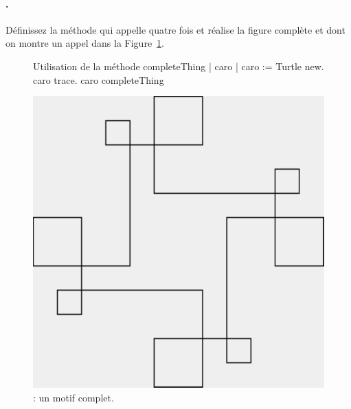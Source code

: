 \paragraph{.}
D\'efinissez la m\'ethode  qui appelle quatre fois
 et r\'ealise la figure compl\`ete  et dont on montre un appel 
 dans la Figure~\ref{c7completething}.



\begin{figure} 
\begin{minipage}[t]{.55\linewidth}
\begin{ncscript}{Utilisation de la m\'ethode completeThing}
| caro |
caro := Turtle new.
caro trace.
caro completeThing
\end{ncscript}
\end{minipage}
\begin{minipage}{.45\linewidth}
\centerline{\includegraphics[width=\linewidth]{c7completething}}
\end{minipage}
\caption{ : un motif complet.}
\label{c7completething}
\end{figure}


